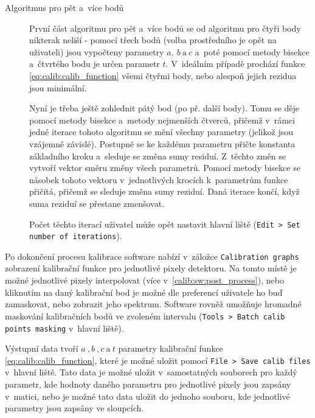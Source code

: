 \begin{description}
	\item[Algoritmus pro pět a~více bodů]
	První část algoritmu pro pět a~více bodů se od algoritmu pro čtyři body nikterak neliší - pomocí třech bodů (volba prostředního je opět na uživateli) jsou vypočteny parametry $a,~b~\text{a}~c$ a~poté pomocí metody bisekce a~čtvrtého bodu je určen parametr $t$. V~ideálním případě prochází funkce \ref{eq:calib:calib_function} všemi čtyřmi body, nebo alespoň jejich rezidua jsou minimální. 

	Nyní je třeba ještě zohlednit pátý bod (po př. další body). Tomu se děje pomocí metody bisekce a~metody nejmenších čtverců, přičemž v~rámci jedné iterace tohoto algoritmu se mění všechny parametry (jelikož jsou vzájemně závislé). Postupně se ke každému parametru přičte konstanta základního kroku a~sleduje se změna sumy residuí. Z~těchto změn se vytvoří vektor směru změny všech parametrů. Pomocí metody bisekce se násobek tohoto vektoru v~jednotlivých krocích k~parametrům funkce přičítá, přičemž se sleduje změna sumy reziduí. Daná iterace končí, když suma reziduí se přestane zmenšovat.

	Počet těchto iterací uživatel může opět nastavit hlavní liště (\texttt{Edit > Set number of iterations}).

\end{description}

Po dokončení procesu kalibrace software nabízí v~záložce \texttt{Calibration graphs} zobrazení kalibrační funkce pro jednotlivé pixely detektoru. Na tomto místě je možné jednotlivé pixely interpolovat (více v~\ref{calib:sw:post_process}), nebo kliknutím na daný kalibrační bod je možné dle preferencí uživatele ho buď zamaskovat, nebo zobrazit jeho spektrum. Software rovněž umožňuje hromadné maskování kalibračních bodů ve zvoleném intervalu (\texttt{Tools > Batch calib points masking} v~hlavní liště).

Výstupní data tvoří $a~,b~,c~\text{a}~t$ parametry kalibrační funkce \ref{eq:calib:calib_function}, které je možné uložit pomocí \texttt{File > Save calib files} v~hlavní liště. Tato data je možné uložit v~samostatných souborech pro každý parametr, kde hodnoty daného parametru pro jednotlivé pixely jsou zapsány v~matici, nebo je možné tato data uložit do jednoho souboru, kde jednotlivé parametry jsou zapsány ve sloupcích.


